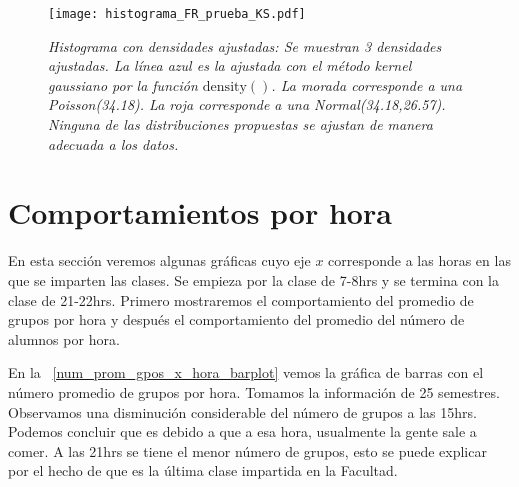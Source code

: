 
\begin{figure}[H]
\centering
\texttt{[image: histograma\_FR\_prueba\_KS.pdf]} %
\caption[\textit{Histograma con densidades ajustadas}]{\textit{Histograma con densidades ajustadas: Se muestran 3 densidades ajustadas. La línea azul es la ajustada con el método kernel gaussiano por la función $\mathrm{density()}$. La morada corresponde a una Poisson(34.18). La roja corresponde a una Normal(34.18,26.57). Ninguna de las distribuciones propuestas se ajustan de manera adecuada a los datos.}}\label{histFR_pruebaKS}
\end{figure}



\section{Comportamientos por hora}

En esta sección veremos algunas gráficas cuyo eje $x$ corresponde a las horas en las que se imparten las clases. Se empieza por la clase de 7-8hrs y se termina con la clase de 21-22hrs. Primero mostraremos el comportamiento del promedio de grupos por hora y después el comportamiento del promedio del número de alumnos por hora.

En la \figurename{~\ref{num_prom_gpos_x_hora_barplot}} vemos la gráfica de barras con el número promedio de grupos por hora. Tomamos la información de 25 semestres. Observamos una disminución considerable del número de grupos a las 15hrs. Podemos concluir que es debido a que a esa hora, usualmente la gente sale a comer. A las 21hrs se tiene el menor número de grupos, esto se puede explicar por el hecho de que es la última clase impartida en la Facultad.

